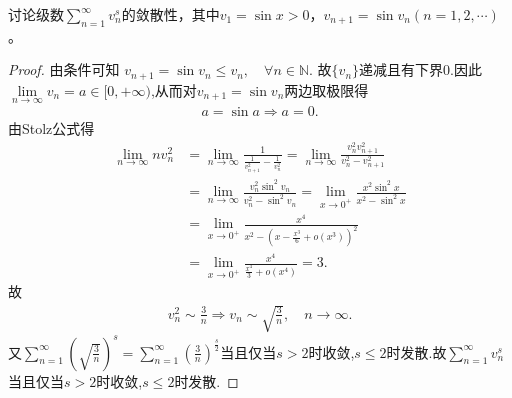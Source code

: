 \documentclass[../../main.tex]{subfiles}
\begin{document}
\begin{example}
讨论级数$\sum\limits_{n=1}^{\infty} v_n^s$的敛散性，其中$v_1 = \sin x > 0$，$v_{n+1} = \sin v_n (n = 1, 2, \cdots)$。
\end{example}
\begin{proof}
由条件可知
$v_{n+1}=\sin v_n\leqslant v_n,\quad \forall n\in \mathbb{N} .$
故$\{ v_n \}$递减且有下界$0.$因此$\lim\limits_{n\rightarrow \infty}v_n=a\in [ 0,+\infty )$,从而对$v_{n+1}=\sin v_n$两边取极限得
\begin{align*}
a=\sin a\Longrightarrow a=0.
\end{align*}
由Stolz公式得
\begin{align*}
\lim\limits_{n\rightarrow \infty}nv_{n}^{2}&=\lim\limits_{n\rightarrow \infty}\frac{1}{\frac{1}{v_{n+1}^{2}}-\frac{1}{v_{n}^{2}}}=\lim\limits_{n\rightarrow \infty}\frac{v_{n}^{2}v_{n+1}^{2}}{v_{n}^{2}-v_{n+1}^{2}}
\\
&=\lim\limits_{n\rightarrow \infty}\frac{v_{n}^{2}\sin ^2v_n}{v_{n}^{2}-\sin ^2v_n}=\lim\limits_{x\rightarrow 0^+}\frac{x^2\sin ^2x}{x^2-\sin ^2x}
\\
&=\lim\limits_{x\rightarrow 0^+}\frac{x^4}{x^2-\left( x-\frac{x^3}{6}+o\left( x^3 \right) \right) ^2}
\\
&=\lim\limits_{x\rightarrow 0^+}\frac{x^4}{\frac{x^4}{3}+o\left( x^4 \right)}=3.
\end{align*}
故
\begin{align*}
v_{n}^{2}\sim \frac{3}{n}\Longrightarrow v_n\sim \sqrt{\frac{3}{n}},\quad n\rightarrow \infty .
\end{align*}
又$\sum_{n=1}^{\infty}{\left( \sqrt{\frac{3}{n}} \right) ^s}=\sum_{n=1}^{\infty}{\left( \frac{3}{n} \right) ^{\frac{s}{2}}}$当且仅当$s>2$时收敛,$s\leqslant 2$时发散.故$\sum_{n=1}^{\infty}{v_{n}^{s}}$当且仅当$s>2$时收敛,$s\leqslant 2$时发散.

\end{proof}
\end{document}
